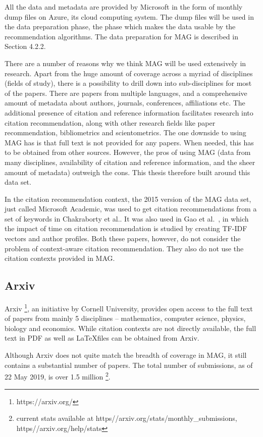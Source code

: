 All the data and metadata are provided by Microsoft in the form of monthly dump files on Azure, its cloud computing system. The dump files will be used in the data preparation phase, the phase which makes the data usable by the recommendation algorithms. The data preparation for MAG is described in Section 4.2.2. 

There are a number of reasons why we think MAG will be used extensively in research. Apart from the huge amount of coverage across a myriad of disciplines (fields of study), there is a possibility to drill down into sub-disciplines for most of the papers. There are papers from multiple languages, and a comprehensive amount of metadata about authors, journals, conferences, affiliations etc. The additional presence of citation and reference information facilitates research into citation recommendation, along with other research fields like paper recommendation, bibliometrics and scientometrics. The one downside to using MAG has is that full text is not provided for any papers. When needed, this has to be obtained from other sources. However, the pros of using MAG (data from many disciplines, availability of citation and reference information, and the sheer amount of metadata) outweigh the cons. This thesis therefore built around this data set.

In the citation recommendation context, the 2015 version of the MAG data set, just called Microsoft Academic, was used to get citation recommendations from a set of keywords in Chakraborty et al.\cite{ChakrabortyMNN15}. It was also used in Gao et al.~\cite{Gao15}, in which the impact of time on citation recommendation is studied by creating TF-IDF vectors and author profiles. Both these papers, however, do not consider the problem of context-aware citation recommendation. They also do not use the citation contexts provided in MAG.
\subsection{Arxiv}
Arxiv \footnote{https://arxiv.org/}, an initiative by Cornell University, provides open access to the full text of papers from  mainly 5 disciplines -- mathematics, computer science, physics, biology and economics. While citation contexts are not directly available, the full text in PDF as well as \LaTeX files can be obtained from Arxiv. 

Although Arxiv does not quite match the breadth of coverage in MAG, it still contains a substantial number of papers. 
The total number of submissions, as of 22 May 2019, is over 1.5 million \footnote{current stats available at https\://arxiv.org/stats/monthly\_submissions,\, https\://arxiv.org/help/stats}. 


